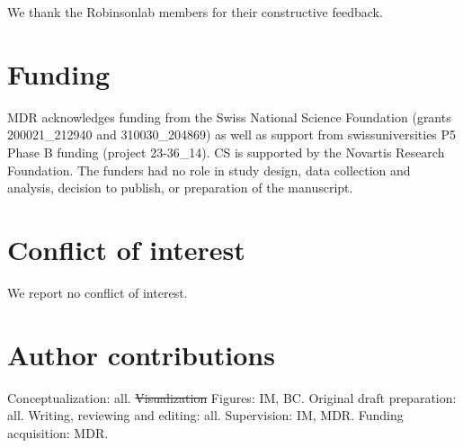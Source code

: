 \documentclass[11pt]{article}
\begin{document}
We thank the Robinsonlab members for their constructive feedback.

{\color{red}
\section*{Funding}
MDR acknowledges funding from the Swiss National Science Foundation (grants 200021\_212940 and 310030\_204869) as well as support from swissuniversities P5 Phase B funding (project 23-36\_14). CS is supported by the Novartis Research Foundation. The funders had no role in study design, data collection and analysis, decision to publish, or preparation of the manuscript.

\section*{Conflict of interest}

We report no conflict of interest.
}
\section*{Author contributions}

Conceptualization: all. {\color{red} \sout{Visualization} Figures: IM,} BC. Original draft preparation: all. Writing, reviewing and editing: all. Supervision: IM, MDR. Funding acquisition: MDR.



\pagebreak
\linespread{1} 



\end{document}
